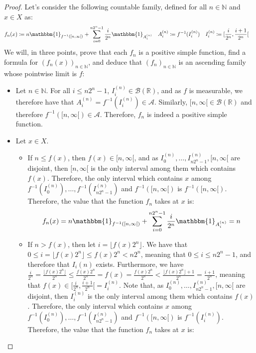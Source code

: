 \documentclass{article}
\theoremstyle{definition}
\theoremstyle{remark}
\theoremstyle{example}
\theoremstyle{notation}
\begin{document}
\begin{proof}
		Let's consider the following countable family, defined for all $n \in \mathbb{N}$ and $x \in X$ as:
		\begin{align*}
				f_n(x) & \coloneq n\mathbbm{1}_{f^{-1}([n, \infty[)} + \sum_{i=0}^{n2^n - 1} \frac{i}{2^n}\mathbbm{1}_{A_i^{(n)}} & A_i^{(n)} &\coloneq f^{-1}(I_i^{(n)}) & I_i^{(n)} &\coloneq [\frac{i}{2^n}, \frac{i+1}{2^n}[
		\end{align*}
		We will, in three points, prove that each $f_n$ is a positive simple function, find a formula for $(f_n(x))_{n \in \mathbb{N}}$, and deduce that $(f_n)_{n \in \mathbb{N}}$ is an ascending family whose pointwise limit is $f$:
		\begin{itemize}
				\item Let $n \in \mathbb{N}$. For all $i \leq n2^n - 1$, $I_i^{(n)} \in \mathcal{B}(\mathbb{R})$, and as $f$ is measurable, we therefore have that $A_i^{(n)} = f^{-1}(I_i^{(n)}) \in \mathcal{A}$. Similarly, $[n, \infty[ \in \mathcal{B}(\mathbb{R})$ and therefore $f^{-1}([n, \infty[) \in \mathcal{A}$. Therefore, $f_n$ is indeed a positive simple function.	
				\item Let $x \in X$.
				\begin{itemize}
						\item If $n \leq f(x)$, then $f(x) \in [n, \infty[$, and as $I_0^{(n)}, \dots, I_{n2^n - 1}^{(n)}, [n, \infty[$ are disjoint, then $[n, \infty[$ is the only interval among them which contains $f(x)$. Therefore, the only interval which contains $x$ among $f^{-1}(I_0^{(n)}), \dots, f^{-1}(I_{n2^n - 1}^{(n)})$ and $f^{-1}([n, \infty[)$ is $f^{-1}([n, \infty[)$. Therefore, the value that the function $f_n$ takes at $x$ is:
								$$f_n(x) = n\mathbbm{1}_{f^{-1}([n, \infty[)} + \sum_{i=0}^{n2^n - 1} \frac{i}{2^n}\mathbbm{1}_{A_i^{(n)}} = n$$
						\item If $n > f(x)$, then let $i = \lfloor f(x) 2^n \rfloor$. We have that $0 \leq i = \lfloor f(x)2^n \rfloor \leq f(x)2^n < n2^n$, meaning that $0 \leq i \leq n2^n - 1$, and therefore that $I_i{(n)}$ exists. Furthermore, we have $\frac{i}{2^n} = \frac{\lfloor f(x) 2^n\rfloor}{2^n} \leq \frac{f(x)2^n}{2^n} = f(x) = \frac{f(x)2^n}{2^n} < \frac{\lfloor f(x)2^n \rfloor + 1}{2^n} = \frac{i + 1}{2^n}$, meaning that $f(x) \in [\frac{i}{2^n}, \frac{i + 1}{2^n}[ = I_i^{(n)}$. Note that, as $I_0^{(n)}, \dots, I_{n2^n - 1}^{(n)}, [n, \infty[$ are disjoint, then $I_i^{(n)}$ is the only interval among them which contains $f(x)$. Therefore, the only interval which contains $x$ among $f^{-1}(I_0^{(n)}), \dots, f^{-1}(I_{n2^n - 1}^{(n)})$ and $f^{-1}([n, \infty[)$ is $f^{-1}(I_i^{(n)})$. Therefore, the value that the function $f_n$ takes at $x$ is:

\end{itemize}
\end{itemize}
\end{proof}
\end{document}
